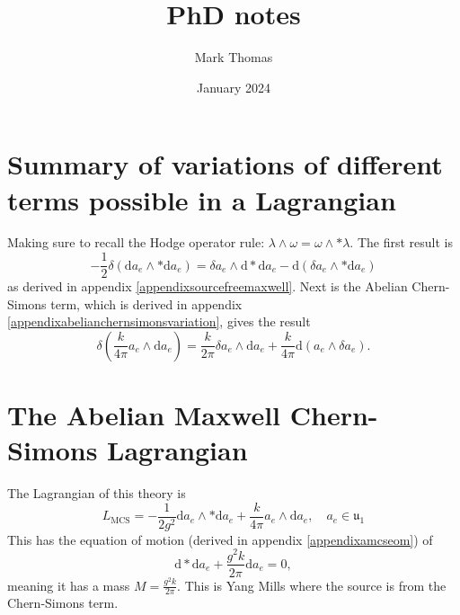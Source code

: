 \documentclass{article}
\title{PhD notes}
\author{Mark Thomas}
\date{January 2024}
\begin{document}
\maketitle


\section{Summary of variations of different terms possible in a Lagrangian}
Making sure to recall the Hodge operator rule: $\lambda \wedge \omega = \omega \wedge * \lambda$. The first result is
\begin{equation}
    \label{Eq: Maxwell term variation}
    -\frac{1}{2}\delta\left(\mathrm{d}a_{e}\wedge *\mathrm{d}a_{e} \right) = \delta a_{e}\wedge \mathrm{d} * \mathrm{d}a_{e}- \mathrm{d}\left(\delta{a}_{e}\wedge * \mathrm{d}a_{e} \right)
\end{equation}
as derived in appendix \ref{appendixsourcefreemaxwell}. Next is the Abelian Chern-Simons term, which is derived in appendix \ref{appendixabelianchernsimonsvariation}, gives the result
\begin{equation}
    \label{Eq: Chern simons term variation}
    \delta\left(\frac{k}{4\pi}a_{e}\wedge \mathrm{d}a_{e} \right) = \frac{k}{2\pi}\delta a_{e}\wedge \mathrm{d}a_{e} + \frac{k}{4\pi}\mathrm{d}\left(a_{e}\wedge \delta a_{e}\right).
\end{equation}


\section{The Abelian Maxwell Chern-Simons Lagrangian}
The Lagrangian of this theory is 
\begin{equation}
    L_{\text{MCS}} = -\frac{1}{2g^{2}} \mathrm{d}a_{e}\wedge * \mathrm{d}a_{e} + \frac{k}{4\pi}a_{e}\wedge \mathrm{d}a_{e},\quad a_{e}\in \mathfrak{u_{1}}
\end{equation}
This has the equation of motion (derived in appendix \ref{appendixamcseom}) of 
\begin{equation}
    \mathrm{d} * \mathrm{d} a_{e} + \frac{g^{2}k}{2\pi}\mathrm{d}a_{e}=0,
\end{equation}
meaning it has a mass $M = \frac{g^{2}k}{2\pi}$. This is Yang Mills where the source is from the Chern-Simons term. 
\end{document}
